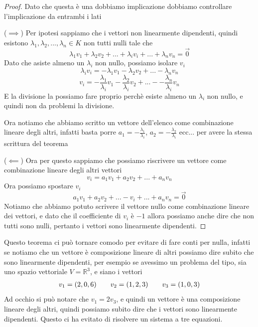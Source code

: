 \documentclass{rapport}
\begin{document}
\begin{proof}
  Dato che questa è una dobbiamo implicazione dobbiamo controllare l'implicazione da entrambi i lati
  
  ($\implies$) Per ipotesi sappiamo che i vettori non linearmente dipendenti, quindi esistono $\lambda_1, \lambda_2, ..., \lambda_n \in K$ non tutti nulli tale che
  \[
  \lambda_1 v_1 + \lambda_2 v_2 + ...+ \lambda_i v_i + ... + \lambda_n v_n = \vec{0}    
  \]
  Dato che asiste almeno un $\lambda_i$ non nullo, possiamo isolare $v_i$
  \[
   \lambda_i v_i   =  -\lambda_1 v_1 - \lambda_2 v_2 + ...- \lambda_n v_n
  \]
  \[
   v_i   =  -\dfrac{\lambda_1 }{\lambda_i }v_1 -\dfrac{\lambda_2 }{\lambda_i } v_2 + ...- -\dfrac{\lambda_n }{\lambda_i } v_n
  \]
  E la divisione la possiamo fare proprio perchè esiste almeno un $\lambda_i$ non nullo, e quindi non da problemi la divisione. 

  Ora notiamo che abbiamo scritto un vettore dell'elenco come combinazione lineare degli altri, infatti basta porre $a_1 =- \frac{\lambda_1 }{\lambda_i }$, $a_2 = -\frac{\lambda_2 }{\lambda_i }$ ecc... per avere la stessa scrittura del teorema

  ($\impliedby$) Ora per questo sappiamo che possiamo riscrivere un vettore come combinazione lineare degli altri vettori
  \[
  v_i = a_1 v_1 + a_2 v_2 + ... + a_nv_n
  \]
  Ora possiamo spostare $v_i$ 
  \[
    a_1 v_1 + a_2 v_2 + ... -v_i+... + a_nv_n = \vec{0}
  \]
  Notiamo che abbiamo potuto scrivere il vettore nullo come combinazione lineare dei vettori, e dato che il coefficiente di $v_i$ è $-1$ allora possiamo anche dire che non tutti sono nulli, pertanto i vettori sono linearmente dipendenti.
\end{proof}

Questo teorema ci può tornare comodo per evitare di fare conti per nulla, infatti se notiamo che un vettore è composizione lineare di altri possiamo dire subito che sono linearmente dipendenti, per esempio se avessimo un problema del tipo, sia uno spazio vettoriale $V=\mathbb{R}^3$, e siano i vettori 
\[
\begin{array}{c@{\qquad}c@{\qquad}c}
  v_1=(2,0,6)  & v_2 = (1,2,3) & v_3=(1,0,3)
\end{array}
\]
Ad occhio si può notare che $v_1=2v_3$, e quindi un vettore è una composizione lineare degli altri, quindi possiamo subito dire che i vettori sono linearmente dipendenti. Questo ci ha evitato di risolvere un sistema a tre equazioni.
\end{document}
